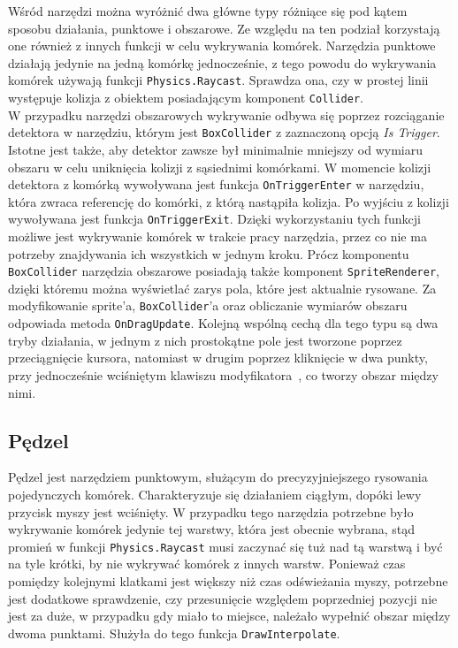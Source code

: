 Wśród narzędzi można wyróżnić dwa główne typy różniące się pod kątem sposobu działania, punktowe i obszarowe.
Ze względu na ten podział korzystają one również z innych funkcji w celu wykrywania komórek.
Narzędzia punktowe działają jedynie na jedną komórkę jednocześnie,
z tego powodu do wykrywania komórek używają funkcji \texttt{Physics.Raycast}.
Sprawdza ona, czy w prostej linii występuje kolizja z obiektem posiadającym komponent \texttt{Collider}.\\
\indent W przypadku narzędzi obszarowych wykrywanie odbywa się poprzez rozciąganie detektora w narzędziu,
którym jest \texttt{BoxCollider} z zaznaczoną opcją \textit{Is Trigger}.%
Istotne jest także,
aby detektor zawsze był minimalnie mniejszy od wymiaru obszaru w celu uniknięcia kolizji z sąsiednimi komórkami.
%
W momencie kolizji detektora z komórką wywoływana jest funkcja \texttt{OnTriggerEnter} w narzędziu,
która zwraca referencję do komórki, z którą nastąpiła kolizja.
Po wyjściu z kolizji wywoływana jest funkcja \texttt{OnTriggerExit}.
Dzięki wykorzystaniu tych funkcji możliwe jest wykrywanie komórek w trakcie pracy narzędzia,
przez co nie ma potrzeby znajdywania ich wszystkich w jednym kroku.
Prócz komponentu \texttt{BoxCollider} narzędzia obszarowe posiadają także komponent \texttt{SpriteRenderer},
dzięki któremu można wyświetlać zarys pola, które jest aktualnie rysowane.
Za modyfikowanie sprite'a, \texttt{BoxCollider}'a oraz obliczanie wymiarów obszaru odpowiada metoda \texttt{OnDragUpdate}. 
Kolejną wspólną cechą dla tego typu są dwa tryby działania,
w jednym z nich prostokątne pole jest tworzone poprzez przeciągnięcie kursora,
natomiast w drugim poprzez kliknięcie w dwa punkty,
przy jednocześnie wciśniętym klawiszu modyfikatora~, co tworzy obszar między nimi.

\subsection{Pędzel}
\label{subsec:pedzel}

Pędzel jest narzędziem punktowym, służącym do precyzyjniejszego rysowania pojedynczych komórek.
Charakteryzuje się działaniem ciągłym, dopóki lewy przycisk myszy jest wciśnięty.
W przypadku tego narzędzia potrzebne było wykrywanie komórek jedynie tej warstwy, która jest obecnie wybrana,
stąd promień w funkcji \texttt{Physics.Raycast} musi zaczynać się tuż nad tą warstwą
i być na tyle krótki, by nie wykrywać komórek z innych warstw.
Ponieważ czas pomiędzy kolejnymi klatkami jest większy niż czas odświeżania myszy,
potrzebne jest dodatkowe sprawdzenie, czy przesunięcie względem poprzedniej pozycji nie jest za duże,
w przypadku gdy miało to miejsce, należało wypełnić obszar między dwoma punktami.
Służyła do tego funkcja \texttt{DrawInterpolate}.%

